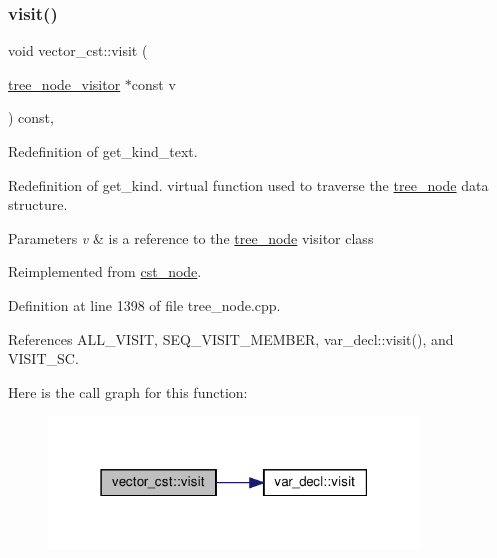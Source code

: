 \mbox{\label{structvector__cst_a6efa88e172cac566dcfb5fd0a04ff947}} 
\subsubsection{\texorpdfstring{visit()}{visit()}}
{\footnotesize\ttfamily void vector\+\_\+cst\+::visit (\begin{DoxyParamCaption}\item[{\hyperlink{classtree__node__visitor}{tree\+\_\+node\+\_\+visitor} $\ast$const}]{v }\end{DoxyParamCaption}) const\hspace{0.3cm}{\ttfamily [override]}, {\ttfamily [virtual]}}



Redefinition of get\+\_\+kind\+\_\+text. 

Redefinition of get\+\_\+kind. virtual function used to traverse the \hyperlink{classtree__node}{tree\+\_\+node} data structure. 
\begin{DoxyParams}{Parameters}
{\em v} & is a reference to the \hyperlink{classtree__node}{tree\+\_\+node} visitor class \\
\hline
\end{DoxyParams}


Reimplemented from \hyperlink{structcst__node_a64e2bc20ffda1b13ffe894cacb982f89}{cst\+\_\+node}.



Definition at line 1398 of file tree\+\_\+node.\+cpp.



References A\+L\+L\+\_\+\+V\+I\+S\+IT, S\+E\+Q\+\_\+\+V\+I\+S\+I\+T\+\_\+\+M\+E\+M\+B\+ER, var\+\_\+decl\+::visit(), and V\+I\+S\+I\+T\+\_\+\+SC.

Here is the call graph for this function\+:
\nopagebreak
\begin{figure}[H]
\begin{center}
\leavevmode
\includegraphics[width=279pt]{d8/d7d/structvector__cst_a6efa88e172cac566dcfb5fd0a04ff947_cgraph}
\end{center}
\end{figure}


